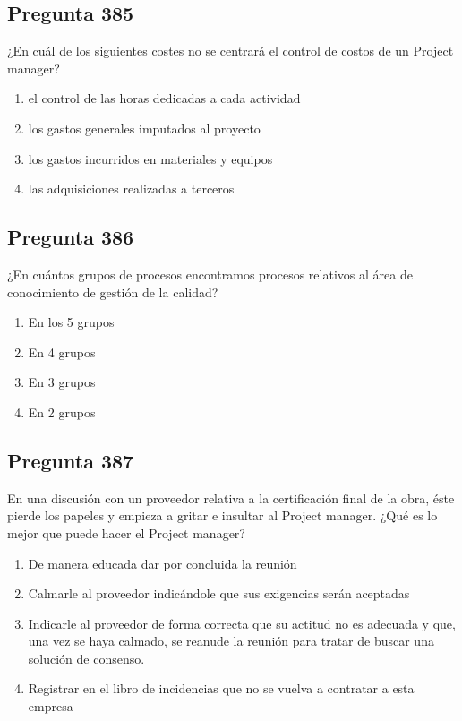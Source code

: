 \documentclass[11pt,a4paper]{article}
\begin{document}
\subsection*{Pregunta 385}
¿En cuál de los siguientes costes no se centrará el control de costos de un Project manager?

\begin{enumerate}[label=\alph*)]
  \item el control de las horas dedicadas a cada actividad
  \item los gastos generales imputados al proyecto
  \item los gastos incurridos en materiales y equipos
  \item las adquisiciones realizadas a terceros
\end{enumerate}

\subsection*{Pregunta 386}
¿En cuántos grupos de procesos encontramos procesos relativos al área de conocimiento de gestión de la calidad?

\begin{enumerate}[label=\alph*)]
  \item En los 5 grupos
  \item En 4 grupos
  \item En 3 grupos
  \item En 2 grupos
\end{enumerate}

\subsection*{Pregunta 387}
En una discusión con un proveedor relativa a la certificación final de la obra, éste pierde los papeles y empieza a gritar e insultar al Project manager. ¿Qué es lo mejor que puede hacer el Project manager?

\begin{enumerate}[label=\alph*)]
  \item De manera educada dar por concluida la reunión
  \item Calmarle al proveedor indicándole que sus exigencias serán aceptadas
  \item Indicarle al proveedor de forma correcta que su actitud no es adecuada y que, una vez se haya calmado, se reanude la reunión para tratar de buscar una solución de consenso.
  \item Registrar en el libro de incidencias que no se vuelva a contratar a esta empresa
\end{enumerate}
\end{document}
